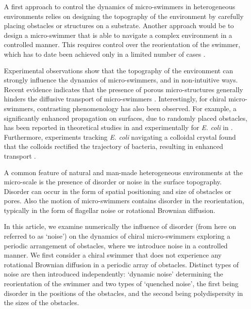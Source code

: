 \documentclass[aps,pre,twocolumn,showpacs,superscriptaddress,amsmath,amssymb,longbibliography]{revtex4-2}
\begin{document}
A first approach to control the dynamics of micro-swimmers in heterogeneous environments relies on designing the topography of the environment by carefully placing obstacles or structures on a substrate. Another approach would be to design a micro-swimmer that is able to navigate a complex environment in a controlled manner\cite{controlldr3}. This requires control over the reorientation of the swimmer, which has to date been achieved only in a limited number of cases \cite{controlldr1, controlldr2}.

Experimental observations show that the topography of the environment can strongly influence the dynamics of micro-swimmers, and in non-intuitive ways. Recent evidence indicates that the presence of porous micro-structures generally hinders the diffusive transport of micro-swimmers \cite{experiments1, lorentzgas}. Interestingly, for chiral micro-swimmers, contrasting phenomenology has also been observed. For example, a significantly enhanced propagation on surfaces, due to randomly placed obstacles, has been reported in theoretical studies in \cite{franosh1, franosh2} and experimentally for \textit{E. coli} in \cite{forward}. Furthermore, experiments tracking \textit{E. coli} navigating a colloidal crystal found that the colloids rectified the trajectory of bacteria, resulting in enhanced transport \cite{lattice, lattice2, lattice3, 3d}.

A common feature of natural and man-made heterogeneous environments at the micro-scale is the presence of disorder or noise in the surface topography. Disorder can occur in the form of spatial positioning and size of obstacles or pores. Also the motion of micro-swimmers contains disorder in the reorientation, typically in the form of flagellar noise or rotational Brownian diffusion\cite{controlldr1, controlldr2, noiseflagella, noiseflagella2}.

In this article, we examine numerically the influence of disorder (from here on referred to as `noise') on the dynamics of chiral micro-swimmers exploring a periodic arrangement of obstacles, where we introduce noise in a controlled manner. We first consider a chiral swimmer that does not experience any rotational Brownian diffusion in a periodic array of obstacles. Distinct types of noise are then introduced independently: `dynamic noise' determining the reorientation of the swimmer and two types of `quenched noise', the first being disorder in the positions of the obstacles, and the second being polydispersity in the sizes of the obstacles. 
\end{document}
